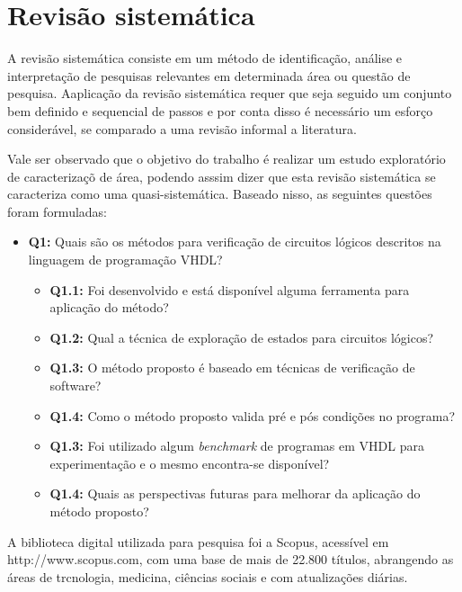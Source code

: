 \label{chapter:correlatos}

\section{Revisão sistemática}
\par
A revisão sistemática consiste em um método de identificação, análise e interpretação de pesquisas relevantes em determinada área ou questão de pesquisa\cite{kitchenham2004procedures}. Aaplicação da revisão sistemática requer que seja seguido um conjunto bem definido e sequencial de passos e por conta disso é necessário um esforço considerável, se comparado a uma revisão informal a literatura\cite{MafraTravassos}.

\par
Vale ser observado que o objetivo do trabalho é realizar um estudo exploratório de caracterizaçõ de área, podendo asssim dizer que esta revisão sistemática se caracteriza como uma quasi-sistemática\cite{travassos2008environment}. Baseado nisso, as seguintes questões foram formuladas:
\begin{itemize}
\item \textbf{Q1:} Quais são os métodos para verificação de circuitos lógicos descritos na linguagem de programação VHDL?
	\begin{itemize}
	\item \textbf{Q1.1:} Foi desenvolvido e está disponível alguma ferramenta para aplicação do método?
	\item \textbf{Q1.2:} Qual a técnica de exploração de estados para circuitos lógicos?
	\item \textbf{Q1.3:} O método proposto é baseado em técnicas de verificação de software?
	\item \textbf{Q1.4:} Como o método proposto valida pré e pós condições no programa?
	\item \textbf{Q1.3:} Foi utilizado algum \textit{benchmark} de programas em VHDL para experimentação e o mesmo encontra-se disponível?
	\item \textbf{Q1.4:} Quais as perspectivas futuras para melhorar da aplicação do método proposto?
	\end{itemize}
\end{itemize}

\par
A biblioteca digital utilizada para pesquisa foi a Scopus, acessível em http://www.scopus.com, com uma base de mais de 22.800 títulos, abrangendo as áreas de trcnologia, medicina, ciências sociais e com atualizações diárias.

